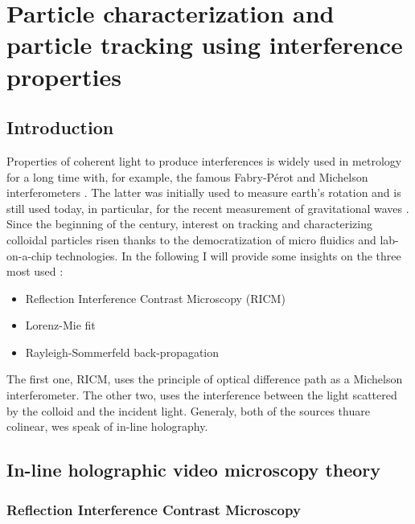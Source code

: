 \newpage
\section{Particle characterization and particle tracking using interference properties}
		\label{sec:chapter2}

\subsection{Introduction}

Properties of coherent light to produce interferences is widely used in metrology for a long time with, for example, the famous Fabry-Pérot  \cite{fabry_theorie_1899, perot_application_1899} and Michelson interferometers \cite{michelson_relative_1887}. The latter was initially used to measure earth's rotation and is still used today, in particular, for the recent measurement of gravitational waves
\cite{ligo_scientific_collaboration_and_virgo_collaboration_gw151226_2016}. 
Since the beginning of the century, interest on tracking and characterizing colloidal particles risen thanks to the democratization of micro fluidics and lab-on-a-chip technologies. In the following I will provide some insights on the three most used :

\begin{itemize}
	\item Reflection Interference Contrast Microscopy (\gls{RICM})
	\item Lorenz-Mie fit
	\item Rayleigh-Sommerfeld back-propagation
\end{itemize}

The first one, \gls{RICM}, uses the principle of optical difference path as a Michelson interferometer. The other two, uses the interference between the light scattered by the colloid and the incident light. Generaly, both of the sources  thuare colinear, wes speak of in-line holography. 

\subsection{In-line holographic video microscopy theory}

\subsubsection{Reflection Interference Contrast Microscopy}

